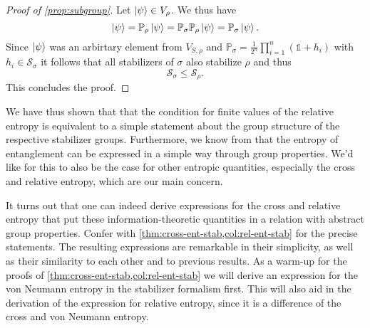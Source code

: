 \begin{proof}[Proof of \cref{prop:subgroup}]
  Let $\ket{\psi} \in V_\rho$. We thus have
  \[
    \ket{\psi} = \mathbb{P}_\rho \ket{\psi} = \mathbb{P}_\sigma \mathbb{P}_\rho
    \ket{\psi} = \mathbb{P}_\sigma
    \ket{\psi}.
  \]
  Since $\ket{\psi}$ was an arbirtary element from $V_{S,\rho}$ and $\mathbb{P}_\sigma =
  \frac{1}{2^n} \prod_{i=1}^n \left(\mathds{1} + h_i\right)$ with $h_i \in
  \mathcal{S}_\sigma$ it follows that all stabilizers of $\sigma$ also stabilize $\rho$
  and thus
  \[
    \mathcal{S}_\sigma \leq \mathcal{S}_\rho.
  \]
  This concludes the proof.
\end{proof}
We have thus shown that that the condition for finite values of the relative
entropy is equivalent to a simple statement about the group structure of the
respective stabilizer groups. Furthermore, we know from 
\cite{fattalEntanglementStabilizerFormalism2004} that the entropy of
entanglement can be expressed in a simple way through group properties.
We'd like for this to also be the case for other entropic quantities,
especially the cross and relative entropy, which are our main concern.

It turns out that one can indeed derive expressions for the cross and relative
entropy that put these information-theoretic quantities in a relation with
abstract group properties. Confer with
\cref{thm:cross-ent-stab,col:rel-ent-stab} for the precise statements. The
resulting expressions are remarkable in their simplicity, as well as their
similarity to each other and to previous results. As a warm-up for the proofs
of \cref{thm:cross-ent-stab,col:rel-ent-stab} we will derive an expression for
the von Neumann entropy in the stabilizer formalism first. This will also aid
in the derivation of the expression for relative entropy, since it is a
difference of the cross and von Neumann entropy.


